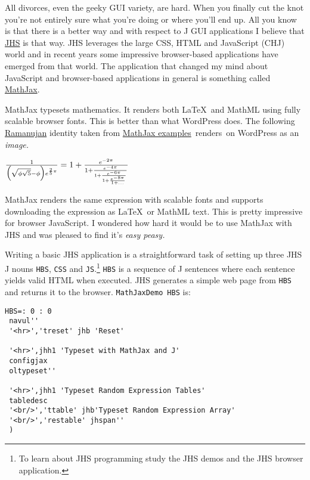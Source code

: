 All divorces, even the geeky GUI variety, are hard. When you finally cut
the knot you're not entirely sure what you're doing or where you'll end
up. All you know is that there is a better way and with respect to J GUI
applications I believe that
\href{http://www.jsoftware.com/jwiki/NYCJUG/2011-02-08/HelloWorldInJHS}{JHS}
is that way. JHS leverages the large CSS, HTML and JavaScript (CHJ)
world and in recent years some impressive browser-based applications
have emerged from that world. The application that changed my mind about
JavaScript and browser-based applications in general is something called
\href{http://www.mathjax.org/}{MathJax}.

MathJax typesets mathematics. It renders both \LaTeX\ and MathML using
fully scalable browser fonts. This is better than what WordPress does.
The following
\href{http://scienceworld.wolfram.com/biography/Ramanujan.html}{Ramanujan}
identity taken from
\href{http://www.mathjax.org/demos/tex-samples/}{MathJax
examples}~renders~on WordPress as an \emph{image.}

\begin{center}
$\frac{1}{\Bigl(\sqrt{\phi \sqrt{5}}-\phi\Bigr) e^{\frac25 \pi}} =
1+\frac{e^{-2\pi}} {1+\frac{e^{-4\pi}} {1+\frac{e^{-6\pi}}
{1+\frac{e^{-8\pi}} {1+\ldots} } } }$
\end{center}

MathJax renders the same expression with scalable fonts and supports
downloading the expression as \LaTeX\ or MathML text. This is pretty
impressive for browser JavaScript. I wondered how hard it would be to
use MathJax with JHS and was pleased to find it's \emph{easy peasy.}

Writing a basic JHS application is a straightforward task of setting up
three JHS J nouns \texttt{HBS}, \texttt{CSS} and
\texttt{JS}.\footnote{
 To learn about JHS programming study the JHS demos and the JHS browser application.
} \texttt{HBS} is a
sequence of J sentences where each sentence yields valid HTML when
executed. JHS generates a simple web page from \texttt{HBS} and returns
it to the browser. \texttt{MathJaxDemo}~\texttt{HBS} is:


\begin{lstlisting}[language=jdoc, frame=single,framerule=0pt,label=lst:scr3402X0]
 HBS=: 0 : 0
 navul''           
 '<hr>','treset' jhb 'Reset'

 '<hr>',jhh1 'Typeset with MathJax and J'
 configjax
 oltypeset''
        
 '<hr>',jhh1 'Typeset Random Expression Tables'
 tabledesc
 '<br/>','ttable' jhb'Typeset Random Expression Array' 
 '<br/>','restable' jhspan''        
 )
\end{lstlisting}

